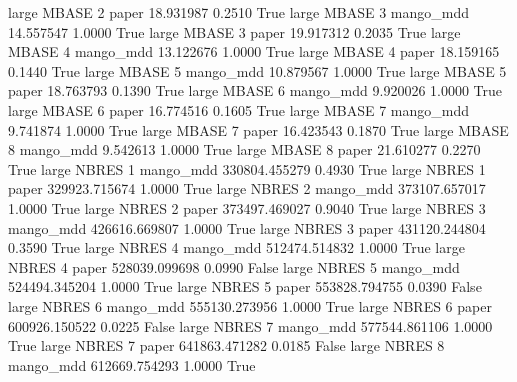      large    MBASE                 2                 paper     18.931987      0.2510    True
     large    MBASE                 3             mango_mdd     14.557547      1.0000    True
     large    MBASE                 3                 paper     19.917312      0.2035    True
     large    MBASE                 4             mango_mdd     13.122676      1.0000    True
     large    MBASE                 4                 paper     18.159165      0.1440    True
     large    MBASE                 5             mango_mdd     10.879567      1.0000    True
     large    MBASE                 5                 paper     18.763793      0.1390    True
     large    MBASE                 6             mango_mdd      9.920026      1.0000    True
     large    MBASE                 6                 paper     16.774516      0.1605    True
     large    MBASE                 7             mango_mdd      9.741874      1.0000    True
     large    MBASE                 7                 paper     16.423543      0.1870    True
     large    MBASE                 8             mango_mdd      9.542613      1.0000    True
     large    MBASE                 8                 paper     21.610277      0.2270    True
     large    NBRES                 1             mango_mdd 330804.455279      0.4930    True
     large    NBRES                 1                 paper 329923.715674      1.0000    True
     large    NBRES                 2             mango_mdd 373107.657017      1.0000    True
     large    NBRES                 2                 paper 373497.469027      0.9040    True
     large    NBRES                 3             mango_mdd 426616.669807      1.0000    True
     large    NBRES                 3                 paper 431120.244804      0.3590    True
     large    NBRES                 4             mango_mdd 512474.514832      1.0000    True
     large    NBRES                 4                 paper 528039.099698      0.0990   False
     large    NBRES                 5             mango_mdd 524494.345204      1.0000    True
     large    NBRES                 5                 paper 553828.794755      0.0390   False
     large    NBRES                 6             mango_mdd 555130.273956      1.0000    True
     large    NBRES                 6                 paper 600926.150522      0.0225   False
     large    NBRES                 7             mango_mdd 577544.861106      1.0000    True
     large    NBRES                 7                 paper 641863.471282      0.0185   False
     large    NBRES                 8             mango_mdd 612669.754293      1.0000    True
